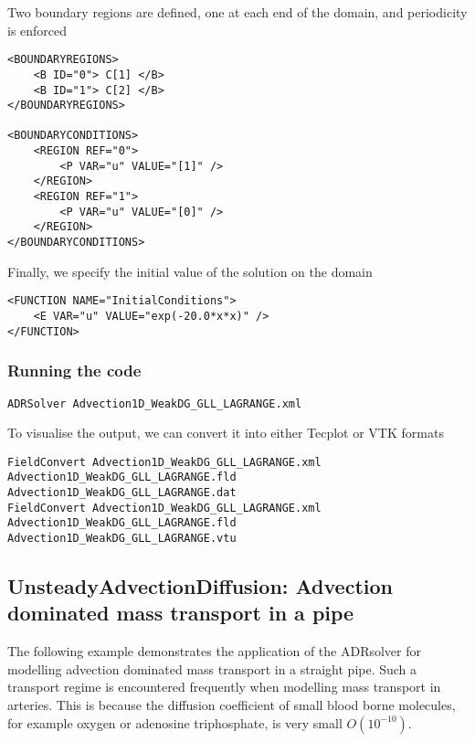Two boundary regions are defined, one at each end of the domain, and periodicity
is enforced
\begin{lstlisting}[style=XMLStyle]
<BOUNDARYREGIONS>
    <B ID="0"> C[1] </B>
    <B ID="1"> C[2] </B>
</BOUNDARYREGIONS>

<BOUNDARYCONDITIONS>
    <REGION REF="0">
        <P VAR="u" VALUE="[1]" />
    </REGION>
    <REGION REF="1">
        <P VAR="u" VALUE="[0]" />
    </REGION>
</BOUNDARYCONDITIONS>
\end{lstlisting}

Finally, we specify the initial value of the solution on the domain
\begin{lstlisting}[style=XMLStyle]
<FUNCTION NAME="InitialConditions">
    <E VAR="u" VALUE="exp(-20.0*x*x)" />
</FUNCTION>
\end{lstlisting}

\subsubsection{Running the code}
\begin{lstlisting}[style=BashInputStyle]
ADRSolver Advection1D_WeakDG_GLL_LAGRANGE.xml
\end{lstlisting}

To visualise the output, we can convert it into either Tecplot or VTK formats
\begin{lstlisting}[style=BashInputStyle]
FieldConvert Advection1D_WeakDG_GLL_LAGRANGE.xml Advection1D_WeakDG_GLL_LAGRANGE.fld Advection1D_WeakDG_GLL_LAGRANGE.dat
FieldConvert Advection1D_WeakDG_GLL_LAGRANGE.xml Advection1D_WeakDG_GLL_LAGRANGE.fld Advection1D_WeakDG_GLL_LAGRANGE.vtu
\end{lstlisting}


\subsection{UnsteadyAdvectionDiffusion: Advection dominated mass transport in a pipe}

The following example demonstrates the application of the ADRsolver for
modelling advection dominated mass transport in a straight pipe.
Such a transport regime is encountered frequently when modelling mass transport
in arteries. This is because the diffusion coefficient of small blood borne
molecules, for example oxygen or adenosine triphosphate, is very small
$O(10^{-10})$.

